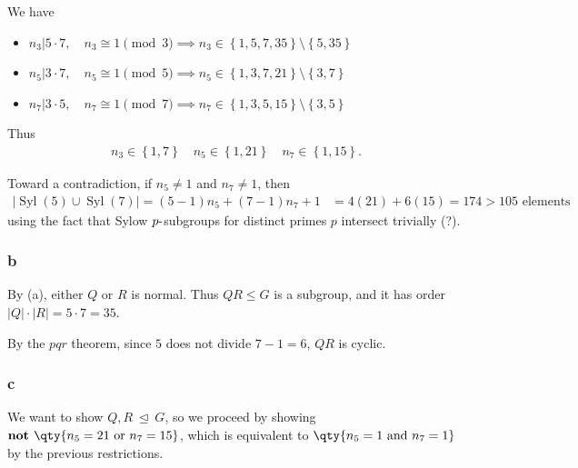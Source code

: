 \begin{solution}
We have

\begin{itemize}
\tightlist
\item
  \(n_3 \mathrel{\Big|}5\cdot 7, \quad n_3 \cong 1 \pmod 3 \implies n_3 \in \left\{{1, 5, 7, 35}\right\} \setminus \left\{{5, 35}\right\}\)
\item
  \(n_5 \mathrel{\Big|}3\cdot 7, \quad n_5 \cong 1 \pmod 5 \implies n_5 \in \left\{{1, 3, 7, 21}\right\}\setminus \left\{{3, 7}\right\}\)
\item
  \(n_7 \mathrel{\Big|}3\cdot 5, \quad n_7 \cong 1 \pmod 7 \implies n_7 \in \left\{{1, 3, 5, 15}\right\}\setminus\left\{{3, 5}\right\}\)
\end{itemize}

Thus
\begin{align*}
n_3 \in \left\{{1, 7}\right\} \quad n_5 \in \left\{{1, 21}\right\} \quad n_7 \in \left\{{1, 15}\right\}
.\end{align*}

Toward a contradiction, if \(n_5\neq 1\) and \(n_7 \neq 1\), then
\begin{align*}
{\left\lvert {{\operatorname{Syl}}(5) \cup{\operatorname{Syl}}(7)} \right\rvert} = (5-1)n_5 + (7-1)n_7 + 1 
&= 4(21) + 6(15) = 174 > 105 \text{ elements}
\end{align*}
using the fact that Sylow \(p{\hbox{-}}\)subgroups for distinct primes
\(p\) intersect trivially (?).

\hypertarget{b-13}{%
\subsubsection{b}\label{b-13}}


By (a), either \(Q\) or \(R\) is normal. Thus \(QR \leq G\) is a
subgroup, and it has order
\({\left\lvert {Q} \right\rvert} \cdot {\left\lvert {R} \right\rvert} = 5\cdot 7 = 35\).

By the \(pqr\) theorem, since \(5\) does not divide \(7-1=6\), \(QR\) is
cyclic.

\hypertarget{c-9}{%
\subsubsection{c}\label{c-9}}

We want to show \(Q, R{~\trianglelefteq~}G\), so we proceed by showing
\(\textbf{not }\qty{n_5 = 21 \text{ or } n_7 = 15}\), which is
equivalent to \(\qty{n_5 = 1 \text{ and } n_7 = 1}\) by the previous
restrictions.


\end{solution}
